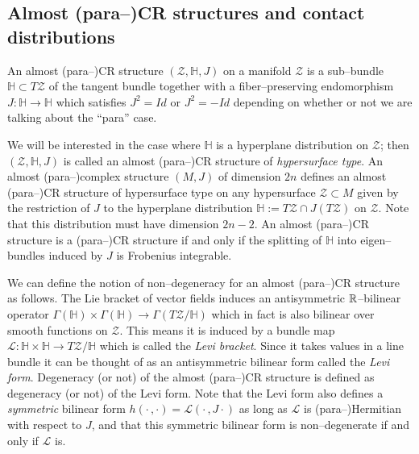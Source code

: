 \subsection{Almost (para--)CR structures and contact distributions}


\begin{defi}
An almost (para--)CR structure $(\mathcal{Z},\mathbb{H} ,J)$ on a manifold $\mathcal{Z}$ is a sub--bundle $\mathbb{H} \subset T\mathcal{Z}$ of the tangent bundle together with a fiber--preserving endomorphism $J:\mathbb{H} \rightarrow \mathbb{H} $ which satisfies $J^2=Id$ or $J^2=-Id$ depending on whether or not we are talking about the ``para'' case.
\end{defi}

We will be interested in the case where $ \mathbb{H} $ is a hyperplane distribution on $\mathcal{Z}$; then $(\mathcal{Z}, \mathbb{H} ,J)$ is called an almost (para--)CR structure of \textit{hypersurface type}. An almost (para--)complex structure $(M,J)$ of dimension $2n$ defines an almost (para--)CR structure of hypersurface type on any hypersurface $\mathcal{Z}\subset M$ given by the restriction of $J$ to the hyperplane distribution $ \mathbb{H} :=T\mathcal{Z}\cap J(T\mathcal{Z})$ on $\mathcal{Z}$. Note that this distribution must have dimension $2n-2$. An almost (para--)CR structure is a (para--)CR structure if and only if the splitting of $ \mathbb{H} $ into eigen--bundles induced by $J$ is Frobenius integrable.

We can define the notion of non--degeneracy for an almost (para--)CR structure as follows. The Lie bracket of vector fields induces an antisymmetric $\mathbb{R}$--bilinear operator $\Gamma( \mathbb{H} )\times\Gamma( \mathbb{H} )\rightarrow\Gamma(T\mathcal{Z}/ \mathbb{H} )$ which in fact is also bilinear over smooth functions on $\mathcal{Z}$. This means it is induced by a bundle map $\mathcal{L}: \mathbb{H} \times \mathbb{H} \rightarrow T\mathcal{Z}/ \mathbb{H} $ which is called the \textit{Levi bracket}. Since it takes values in a line bundle it can be thought of as an antisymmetric bilinear form called the \textit{Levi form}. Degeneracy (or not) of the almost (para--)CR structure is defined as degeneracy (or not) of the Levi form. Note that the Levi form also defines a \textit{symmetric} bilinear form $h(\cdot\,,\cdot)=\mathcal{L}(\cdot\,,J\cdot)$ as long as $\mathcal{L}$ is (para--)Hermitian with respect to $J$, and that this symmetric bilinear form is non--degenerate if and only if $\mathcal{L}$ is.

